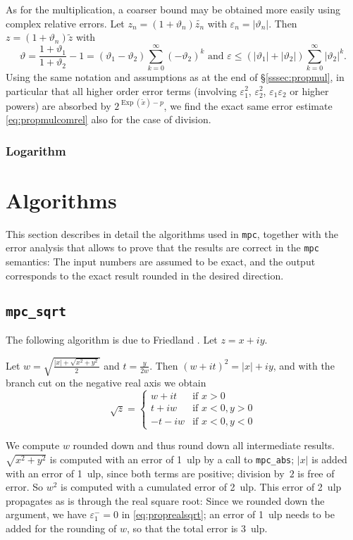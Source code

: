 \documentclass [12pt]{article}
\newcommand {\corr}[1]{{#1}}
\newcommand {\appro}[1]{\widetilde {#1}}
\newcommand {\mpc}{{\tt mpc}}
\newcommand {\ulp}[1]{#1~ulp}
\DeclareMathOperator{\Exp}{\operatorname {Exp}}
\renewcommand {\epsilon}{\varepsilon}
\renewcommand {\theta}{\vartheta}
\renewcommand {\leq}{\leqslant}
\begin{document}
As for the multiplication, a coarser
bound may be obtained more easily using complex relative errors.
Let $\corr {z_n} = (1 + \theta_n) \appro {z_n}$ with
$\epsilon_n = | \theta_n |$. Then $\corr z = (1 + \theta_n) \appro z$
with
\[
\theta = \frac {1 + \theta_1}{1 + \theta_2} - 1
= (\theta_1 - \theta_2) \sum_{k = 0}^\infty (- \theta_2)^k
\text { and }
\epsilon \leq (|\theta_1| + |\theta_2|) \sum_{k = 0}^\infty |\theta_2|^k.
\]
Using the same notation and assumptions as at the end of
\S\ref {sssec:propmul}, in particular that all higher order error terms
(involving $\epsilon_1^2$, $\epsilon_2^2$, $\epsilon_1 \epsilon_2$
or higher powers) are absorbed by $2^{\Exp (\appro x) - p}$,
we find the exact same error estimate \eqref {eq:propmulcomrel}
also for the case of division.


\subsubsection {Logarithm}



\section {Algorithms}

This section describes in detail the algorithms used in \mpc, together with
the error analysis that allows to prove that the results are correct in the
{\mpc} semantics: The input numbers are assumed to be exact, and the output
corresponds to the exact result rounded in the desired direction.


\subsection {\texttt {mpc\_sqrt}}

The following algorithm is due to Friedland \cite{Friedland67,Smith98}.
Let $z = x + i y$.

Let $w = \sqrt { \frac {|x| + \sqrt {x^2 + y^2}}{2}}$ and
$t = \frac {y}{2w}$. Then $(w + it)^2 = |x| + iy$, and with the branch cut on the negative real axis we obtain
\[
\sqrt z = \left\{
\begin {array}{cl}
w + i t & \text {if } x > 0 \\
t + i w & \text {if } x < 0, y > 0 \\
-t - i w & \text {if } x < 0, y < 0
\end {array}
\right.
\]

We compute $w$ rounded down and thus round down all intermediate results.
$\sqrt {x^2 + y^2}$ is computed with an error of \ulp{1}
by a call to \texttt {mpc\_abs}; $|x|$ is added with an error of \ulp{1},
since both terms are positive; division by~$2$ is free of error. So
$w^2$ is computed with a cumulated error of \ulp{2}.
This error of \ulp{2} propagates as is through the real square root:
Since we rounded down the argument, we have $\epsilon_1^- = 0$ in
\eqref {eq:proprealsqrt}; an error of \ulp{1} needs to be added for the
rounding of $w$, so that the total error is \ulp{3}.
\end{document}
